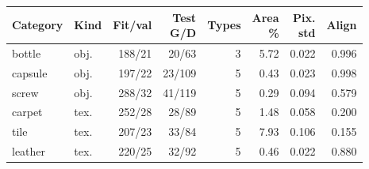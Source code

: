\begin{tabular}{@{}llrrrrrr@{}}
\toprule
Category & Kind & Fit/val & \shortstack{Test\\G/D} & Types & \shortstack{Area\\\%} & \shortstack{Pix.\\std} & Align \\
\midrule
bottle & obj. & 188/21 & 20/63 & 3 & 5.72 & 0.022 & 0.996 \\
capsule & obj. & 197/22 & 23/109 & 5 & 0.43 & 0.023 & 0.998 \\
screw & obj. & 288/32 & 41/119 & 5 & 0.29 & 0.094 & 0.579 \\
carpet & tex. & 252/28 & 28/89 & 5 & 1.48 & 0.058 & 0.200 \\
tile & tex. & 207/23 & 33/84 & 5 & 7.93 & 0.106 & 0.155 \\
leather & tex. & 220/25 & 32/92 & 5 & 0.46 & 0.022 & 0.880 \\
\bottomrule
\end{tabular}
